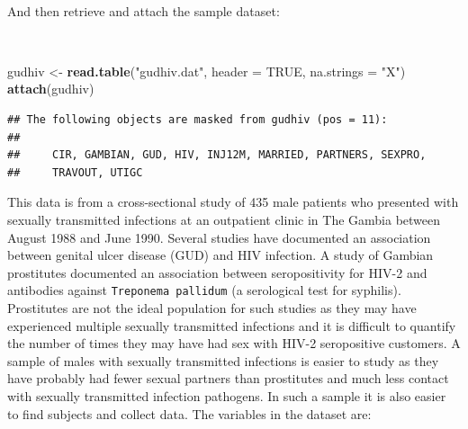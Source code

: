 \documentclass[12pt,a4paper]{book}
\newenvironment{Shaded}{\begin{snugshade}}{\end{snugshade}}
\newcommand{\DataTypeTok}[1]{\textcolor[rgb]{0.13,0.29,0.53}{#1}}
\newcommand{\KeywordTok}[1]{\textcolor[rgb]{0.13,0.29,0.53}{\textbf{#1}}}
\newcommand{\NormalTok}[1]{#1}
\newcommand{\OtherTok}[1]{\textcolor[rgb]{0.56,0.35,0.01}{#1}}
\newcommand{\StringTok}[1]{\textcolor[rgb]{0.31,0.60,0.02}{#1}}
\theoremstyle{definition}
\theoremstyle{definition}
\theoremstyle{definition}
\theoremstyle{remark}
\begin{document}
~

And then retrieve and attach the sample dataset:

~

\begin{Shaded}
\begin{Highlighting}[]
\NormalTok{gudhiv <-}\StringTok{ }\KeywordTok{read.table}\NormalTok{(}\StringTok{"gudhiv.dat"}\NormalTok{, }\DataTypeTok{header =} \OtherTok{TRUE}\NormalTok{, }\DataTypeTok{na.strings =} \StringTok{"X"}\NormalTok{)}
\KeywordTok{attach}\NormalTok{(gudhiv)}
\end{Highlighting}
\end{Shaded}

\begin{verbatim}
## The following objects are masked from gudhiv (pos = 11):
## 
##     CIR, GAMBIAN, GUD, HIV, INJ12M, MARRIED, PARTNERS, SEXPRO,
##     TRAVOUT, UTIGC
\end{verbatim}

\newpage

This data is from a cross-sectional study of 435 male patients who
presented with sexually transmitted infections at an outpatient clinic
in The Gambia between August 1988 and June 1990. Several studies have
documented an association between genital ulcer disease (GUD) and HIV
infection. A study of Gambian prostitutes documented an association
between seropositivity for HIV-2 and antibodies against
\texttt{Treponema\ pallidum} (a serological test for syphilis).
Prostitutes are not the ideal population for such studies as they may
have experienced multiple sexually transmitted infections and it is
difficult to quantify the number of times they may have had sex with
HIV-2 seropositive customers. A sample of males with sexually
transmitted infections is easier to study as they have probably had
fewer sexual partners than prostitutes and much less contact with
sexually transmitted infection pathogens. In such a sample it is also
easier to find subjects and collect data. The variables in the dataset
are:

~
\end{document}
